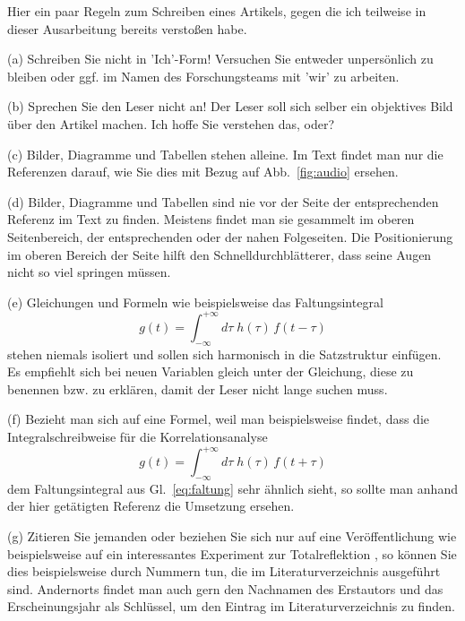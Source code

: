 \documentclass[10pt,twocolumn]{scrartcl}
\begin{document}
Hier ein paar Regeln zum Schreiben eines Artikels, 
gegen die ich teilweise in dieser Ausarbeitung bereits
verstoßen habe.
\begin{list}{-}{}
\item[(a)] Schreiben Sie nicht in 'Ich'-Form! Versuchen Sie entweder 
unpersönlich zu bleiben oder ggf. im Namen des Forschungsteams mit 'wir' zu arbeiten.

\item[(b)] Sprechen Sie den Leser nicht an! Der Leser soll sich selber ein
objektives Bild über den Artikel machen. Ich hoffe Sie verstehen das, oder?

\item[(c)] Bilder, Diagramme und Tabellen stehen alleine. Im Text findet man
nur die Referenzen darauf, wie Sie dies mit Bezug auf
Abb.~\ref{fig:audio} ersehen.

\item[(d)] Bilder, Diagramme und Tabellen sind nie vor der Seite der entsprechenden 
Referenz im Text zu finden. Meistens findet man sie gesammelt im oberen
Seitenbereich, der entsprechenden oder der nahen Folgeseiten. Die Positionierung
im oberen Bereich der Seite hilft den Schnelldurchblätterer, dass seine 
Augen nicht so viel springen müssen.

\item[(e)] Gleichungen und Formeln wie beispielsweise das Faltungsintegral
\begin{equation}
g(t) = \int_{-\infty}^{+\infty}\!\!d\tau \; h(\tau) \, f(t-\tau)
\label{eq:faltung}
\end{equation}
stehen niemals isoliert und sollen sich harmonisch in die Satzstruktur einfügen.
Es empfiehlt sich bei neuen Variablen gleich unter der Gleichung, diese
zu benennen bzw. zu erklären, damit der Leser nicht lange suchen muss.

\item[(f)] Bezieht man sich auf eine Formel, weil man beispielsweise findet,
dass die Integralschreibweise für die Korrelationsanalyse 
\begin{equation}
g(t) = \int_{-\infty}^{+\infty}\!\!d\tau \; h(\tau) \, f(t + \tau)
\end{equation}
dem Faltungsintegral aus Gl.~\eqref{eq:faltung} sehr ähnlich sieht,
so sollte man anhand der hier getätigten Referenz die Umsetzung ersehen.

\item[(g)] Zitieren Sie jemanden oder beziehen Sie sich nur auf eine
Veröffentlichung wie beispielsweise auf ein interessantes Experiment 
zur Totalreflektion \cite{Goos1947}, so können Sie dies beispielsweise 
durch Nummern tun, die im Literaturverzeichnis ausgeführt sind.
Andernorts findet man auch gern den Nachnamen des Erstautors und
das Erscheinungsjahr als Schlüssel, um den Eintrag im Literaturverzeichnis
zu finden. 


\end{list}
\end{document}
